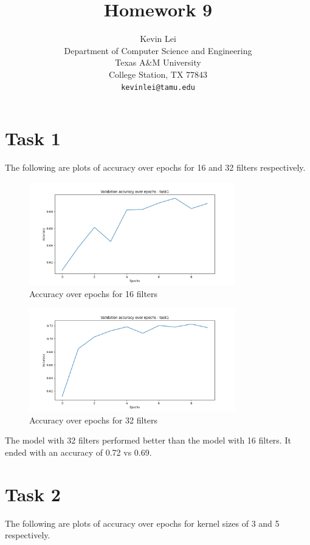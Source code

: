 \documentclass{article}
\title{Homework 9}
\author{
  Kevin Lei \\
  Department of Computer Science and Engineering \\
  Texas A\&M University \\
  College Station, TX 77843 \\
  \texttt{kevinlei@tamu.edu} \\
}
\begin{document}
\maketitle

\section{Task 1}

The following are plots of accuracy over epochs for 16 and 32 filters respectively.

\begin{figure}[H]
  \centering
  \includegraphics[width=0.8\textwidth]{accuracy_task1_num_filters_16.png}
  \caption{Accuracy over epochs for 16 filters}
\end{figure}

\begin{figure}[H]
  \centering
  \includegraphics[width=0.8\textwidth]{accuracy_task1_num_filters_32.png}
  \caption{Accuracy over epochs for 32 filters}
\end{figure}

The model with 32 filters performed better than the model with 16 filters. It ended with an accuracy of 0.72 vs 0.69.

\section{Task 2}

The following are plots of accuracy over epochs for kernel sizes of 3 and 5 respectively.
\end{document}
